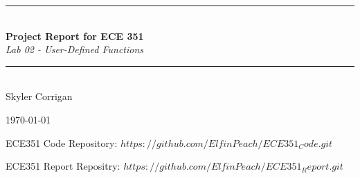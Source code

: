 \documentclass[12pt,a4paper]{article}
\newcommand{\HRule}{\rule{\linewidth}{0.5mm}}
\begin{document}
\begin{titlepage}
\begin{center}



\HRule \\[0.4cm]
{ \LARGE 
  \textbf{Project Report for ECE 351}\\[0.4cm]
  \emph{Lab 02 - User-Defined Functions}\\[0.4cm]
}
\HRule \\[1.5cm]



{ \large
  Skyler Corrigan \\[0.1cm]
}

\vfill



{\large \today}

{ \large
ECE351 Code Repository: $https://github.com/ElfinPeach/ECE351_Code.git$

ECE351 Report Repositry: 
$https://github.com/ElfinPeach/ECE351_Report.git$
}
 
\end{center}
\end{titlepage}


\newpage



\tableofcontents
{}
\newpage
\setcounter{page}{1}

\end{document}
